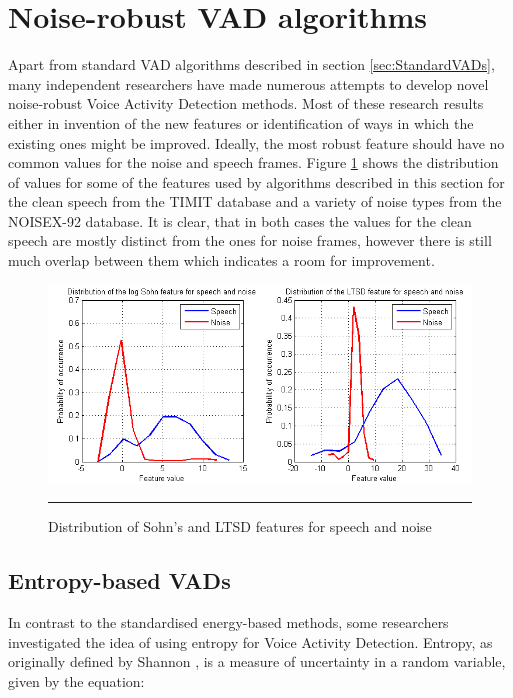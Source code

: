 \section{Noise-robust VAD algorithms}
\label{sec:RobustVADs}

Apart from standard VAD algorithms described in section \ref{sec:StandardVADs}, many independent researchers have made numerous attempts to develop novel noise-robust Voice Activity Detection methods. Most of these research results either in invention of the new features or identification of ways in which the existing ones might be improved. Ideally, the most robust feature should have no common values for the noise and speech frames. Figure \ref{fig:featureDist} shows the distribution of values for some of the features used by algorithms described in this section for the clean speech from the TIMIT \cite{TIMIT} database and a variety of noise types from the NOISEX-92 \cite{NOISEX} database. It is clear, that in both cases the values for the clean speech are mostly distinct from the ones for noise frames, however there is still much overlap between them which indicates a room for improvement.

\begin{figure}[htbp]
	\centering
		\includegraphics[width=0.9\columnwidth]{Figures/featureDist.png}
		\rule{37em}{0.5pt}
	\caption[Distribution of Sohn's and LTSD features for speech and noise]{Distribution of Sohn's \cite{SohnInitial} and LTSD \cite{LTSD} features for speech and noise}
	\label{fig:featureDist}
\end{figure}

\subsection{Entropy-based VADs}

In contrast to the standardised energy-based methods, some researchers investigated the idea of using entropy for Voice Activity Detection. Entropy, as originally defined by Shannon \cite{Shannon}, is a measure of uncertainty in a random variable, given by the equation:


